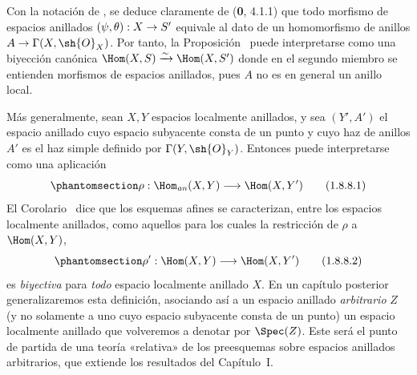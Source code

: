 \documentclass[oneside,10pt]{amsart}
\makeatletter
\newcommand{\ega@arrow}[2]{\mathchoice{#1}{#2}{#2}{#2}}
\renewcommand{\to}{\ega@arrow{\longrightarrow}{\rightarrow}}
\let\EGAOriginalLabel\label
\renewcommand{\label}[1]{\phantomsection\EGAOriginalLabel{#1}}
\makeatother
\begin{document}
\begin{env}[1.8.8]
\label{ega2:addendum:I.1.8.8-fr}
Con la notación de , se deduce claramente de
(\textbf 0, 4.1.1) que todo morfismo de espacios anillados
$(\psi,\theta):X\to S'$ equivale al dato de un homomorfismo de
anillos $A\to\Gamma(X,\sh{O}_X)$. Por tanto, la
Proposición~ puede interpretarse como una biyección
canónica
$\Hom(X,S)\xrightarrow{\sim}\Hom(X,S')$
donde en el segundo miembro se entienden morfismos de espacios
anillados, pues $A$ no es en general un anillo local.

Más generalmente, sean $X,Y$ espacios localmente anillados, y sea
$(Y',A')$ el espacio anillado cuyo espacio subyacente consta de un
punto y cuyo haz de anillos $A'$ es el haz simple definido por
$\Gamma(Y,\sh{O}_Y)$. Entonces  puede interpretarse
como una aplicación
\begin{equation}
\label{ega2:addendum:I.1.8.8.1-fr}
  \rho:\Hom_{\mathit{an}}(X,Y)\to\Hom(X,Y')
\tag{1.8.8.1}
\end{equation}
El Corolario~ dice que los esquemas afines se
caracterizan, entre los espacios localmente anillados, como aquellos
para los cuales la restricción de $\rho$ a $\Hom(X,Y)$,
\begin{equation}
\label{ega2:addendum:I.1.8.8.2-fr}
  \rho':\Hom(X,Y)\to\Hom(X,Y')
\tag{1.8.8.2}
\end{equation}
es \emph{biyectiva} para \emph{todo} espacio localmente anillado $X$. En un capítulo
posterior generalizaremos esta definición, asociando así a un espacio
anillado \emph{arbitrario} $Z$ (y no solamente a uno cuyo espacio subyacente
consta de un punto) un espacio localmente anillado que volveremos a
denotar por $\Spec(Z)$. Este será el punto de partida de una teoría
«relativa» de los preesquemas sobre espacios anillados arbitrarios,
que extiende los resultados del Capítulo~I.
\end{env}
\end{document}
